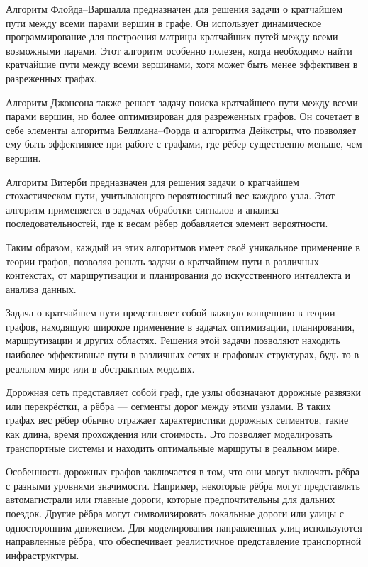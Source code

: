 Алгоритм Флойда–Варшалла предназначен для решения задачи о кратчайшем пути между всеми парами вершин в графе. Он использует динамическое программирование для построения матрицы кратчайших путей между всеми возможными парами. Этот алгоритм особенно полезен, когда необходимо найти кратчайшие пути между всеми вершинами, хотя может быть менее эффективен в разреженных графах.

Алгоритм Джонсона также решает задачу поиска кратчайшего пути между всеми парами вершин, но более оптимизирован для разреженных графов. Он сочетает в себе элементы алгоритма Беллмана–Форда и алгоритма Дейкстры, что позволяет ему быть эффективнее при работе с графами, где рёбер существенно меньше, чем вершин.

Алгоритм Витерби предназначен для решения задачи о кратчайшем стохастическом пути, учитывающего вероятностный вес каждого узла. Этот алгоритм применяется в задачах обработки сигналов и анализа последовательностей, где к весам рёбер добавляется элемент вероятности.

Таким образом, каждый из этих алгоритмов имеет своё уникальное применение в теории графов, позволяя решать задачи о кратчайшем пути в различных контекстах, от маршрутизации и планирования до искусственного интеллекта и анализа данных.

Задача о кратчайшем пути представляет собой важную концепцию в теории графов, находящую широкое применение в задачах оптимизации, планирования, маршрутизации и других областях. Решения этой задачи позволяют находить наиболее эффективные пути в различных сетях и графовых структурах, будь то в реальном мире или в абстрактных моделях.










Дорожная сеть представляет собой граф, где узлы обозначают дорожные развязки или перекрёстки, а рёбра — сегменты дорог между этими узлами. В таких графах вес рёбер обычно отражает характеристики дорожных сегментов, такие как длина, время прохождения или стоимость. Это позволяет моделировать транспортные системы и находить оптимальные маршруты в реальном мире.

Особенность дорожных графов заключается в том, что они могут включать рёбра с разными уровнями значимости. Например, некоторые рёбра могут представлять автомагистрали или главные дороги, которые предпочтительны для дальних поездок. Другие рёбра могут символизировать локальные дороги или улицы с односторонним движением. Для моделирования направленных улиц используются направленные рёбра, что обеспечивает реалистичное представление транспортной инфраструктуры.

